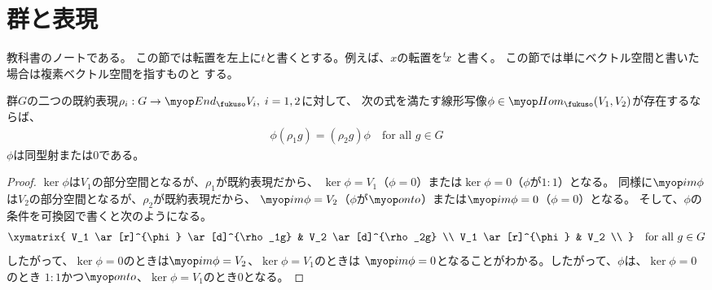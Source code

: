 \section{群と表現}\label{s1:群と表現} %
	教科書\cite{bk:kikkawa.gun}のノートである。
	この節では転置を左上に$t$と書くとする。例えば、$x$の転置を${}^{t}\!{x}$
	と書く。
	この節では単にベクトル空間と書いた場合は複素ベクトル空間を指すものと
	する。

	\begin{proposition}[Schurの補題その一]\label{prop:Schurの補題その一} %
		群$G$の二つの既約表現$\rho_i:G\to \End_\fukuso V_i,\;i=1,2$に対して、
		次の式を満たす線形写像$\phi\in\Hom_\fukuso(V_1,V_2)$が存在するならば、
		\begin{equation*}\begin{split} %
			\phi(\rho_1g) = (\rho_2g)\phi \quad\text{for all }g\in G
		\end{split}\end{equation*} %
		$\phi$は同型射または$0$である。
	\end{proposition} %
	\begin{proof} %
		$\ker\phi$は$V_1$の部分空間となるが、$\rho_1$が既約表現だから、
		$\ker\phi=V_1$（$\phi=0$）または$\ker\phi=0$（$\phi$が$1:1$）となる。
		同様に$\im\phi$は$V_2$の部分空間となるが、$\rho_2$が既約表現だから、
		$\im\phi=V_2$（$\phi$が$\onto$）または$\im\phi=0$（$\phi=0$）となる。
		そして、$\phi$の条件を可換図で書くと次のようになる。
		\begin{equation}\label{eq:intertwiner}\xymatrix{
			V_1 \ar[r]^{\phi} \ar[d]^{\rho_1g} & V_2 \ar[d]^{\rho_2g} \\
			V_1 \ar[r]^{\phi} & V_2 \\
		} \quad\text{for all }g\in G
		\end{equation}
		したがって、$\ker\phi=0$のときは$\im\phi=V_2$、$\ker\phi=V_1$のときは
		$\im\phi=0$となることがわかる。したがって、$\phi$は、$\ker\phi=0$のとき
		$1:1$かつ$\onto$、$\ker\phi=V_1$のとき$0$となる。
	\end{proof} %

